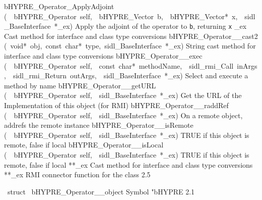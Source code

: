 \documentclass{article}
\begin{document}
\begin{cxxentry}
\begin{cxxnames}
        {bHYPRE\_Operator\_ApplyAdjoint}
        {(\ \ bHYPRE\_Operator\ self,\ \ bHYPRE\_Vector\ b,\ \ bHYPRE\_Vector*\ x,\ \ sidl\_BaseInterface\ *\_ex)}
        {
Apply the adjoint of the operator to {\tt b}, returning {\tt x}}
        {}
\label{cxx.2.17}
        {\_ex}
        {}
        {
Cast method for interface and class type conversions}
        {}
\label{cxx.2.18}
        {bHYPRE\_Operator\_\_cast2}
        {(\ void*\ obj,\ const\ char*\ type,\ sidl\_BaseInterface\ *\_ex)}
        {
String cast method for interface and class type conversions}
        {}
\label{cxx.2.19}
        {bHYPRE\_Operator\_\_exec}
        {(\ \ bHYPRE\_Operator\ self,\ \ const\ char*\ methodName,\ \ sidl\_rmi\_Call\ inArgs,\ \ sidl\_rmi\_Return\ outArgs,\ \ sidl\_BaseInterface\ *\_ex)}
        {
Select and execute a method by name}
        {}
\label{cxx.2.20}
        {bHYPRE\_Operator\_\_getURL}
        {(\ \ bHYPRE\_Operator\ self,\ \ sidl\_BaseInterface\ *\_ex)}
        {
Get the URL of the Implementation of this object (for RMI)}
        {}
\label{cxx.2.21}
        {bHYPRE\_Operator\_\_raddRef}
        {(\ \ bHYPRE\_Operator\ self,\ \ sidl\_BaseInterface\ *\_ex)}
        {
On a remote object, addrefs the remote instance}
        {}
\label{cxx.2.22}
        {bHYPRE\_Operator\_\_isRemote}
        {(\ \ bHYPRE\_Operator\ self,\ \ sidl\_BaseInterface\ *\_ex)}
        {
TRUE if this object is remote, false if local}
        {}
\label{cxx.2.23}
        {bHYPRE\_Operator\_\_isLocal}
        {(\ \ bHYPRE\_Operator\ self,\ \ sidl\_BaseInterface\ *\_ex)}
        {
TRUE if this object is remote, false if local}
        {}
\label{cxx.2.24}
        {**\_ex}
        {}
        {
Cast method for interface and class type conversions}
        {}
\label{cxx.2.25}
        {**\_ex}
        {}
        {
RMI connector function for the class}
        {2.5}
\end{cxxnames}
\begin{cxxvariable}
{\ struct\ }
        {bHYPRE\_Operator\_\_object}
        {}
        {
Symbol "bHYPRE}
        {2.1}
\begin{cxxdoc}


\end{cxxdoc}
\end{cxxvariable}
\end{cxxentry}
\end{document}
